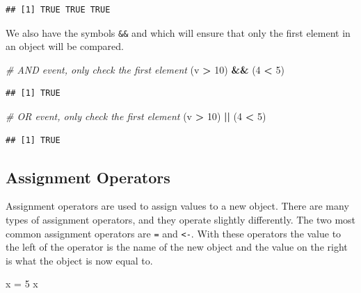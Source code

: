 \documentclass[
]{book}
\newenvironment{Shaded}{\begin{snugshade}}{\end{snugshade}}
\newcommand{\CommentTok}[1]{\textcolor[rgb]{0.56,0.35,0.01}{\textit{#1}}}
\newcommand{\DecValTok}[1]{\textcolor[rgb]{0.00,0.00,0.81}{#1}}
\newcommand{\NormalTok}[1]{#1}
\newcommand{\OperatorTok}[1]{\textcolor[rgb]{0.81,0.36,0.00}{\textbf{#1}}}
\newcommand{\StringTok}[1]{\textcolor[rgb]{0.31,0.60,0.02}{#1}}
\begin{document}
\begin{verbatim}
## [1] TRUE TRUE TRUE
\end{verbatim}

We also have the symbols \texttt{\&\&} and \texttt{\textbar{}\textbar{}} which will ensure that only the first element in an object will be compared.

\begin{Shaded}
\begin{Highlighting}[]
\CommentTok{# AND event, only check the first element}
\NormalTok{(v }\OperatorTok{>}\StringTok{ }\DecValTok{10}\NormalTok{) }\OperatorTok{&&}\StringTok{ }\NormalTok{(}\DecValTok{4} \OperatorTok{<}\StringTok{ }\DecValTok{5}\NormalTok{)}
\end{Highlighting}
\end{Shaded}

\begin{verbatim}
## [1] TRUE
\end{verbatim}

\begin{Shaded}
\begin{Highlighting}[]
\CommentTok{# OR event, only check the first element}
\NormalTok{(v }\OperatorTok{>}\StringTok{ }\DecValTok{10}\NormalTok{) }\OperatorTok{||}\StringTok{ }\NormalTok{(}\DecValTok{4} \OperatorTok{<}\StringTok{ }\DecValTok{5}\NormalTok{)}
\end{Highlighting}
\end{Shaded}

\begin{verbatim}
## [1] TRUE
\end{verbatim}

\hypertarget{assignment-operators}{%
\subsection*{Assignment Operators}\label{assignment-operators}}

Assignment operators are used to assign values to a new object. There are many types of assignment operators, and they operate slightly differently. The two most common assignment operators are \texttt{=} and \texttt{\textless{}-}. With these operators the value to the left of the operator is the name of the new object and the value on the right is what the object is now equal to.

\begin{Shaded}
\begin{Highlighting}[]
\NormalTok{x =}\StringTok{ }\DecValTok{5}
\NormalTok{x}
\end{Highlighting}
\end{Shaded}
\end{document}
